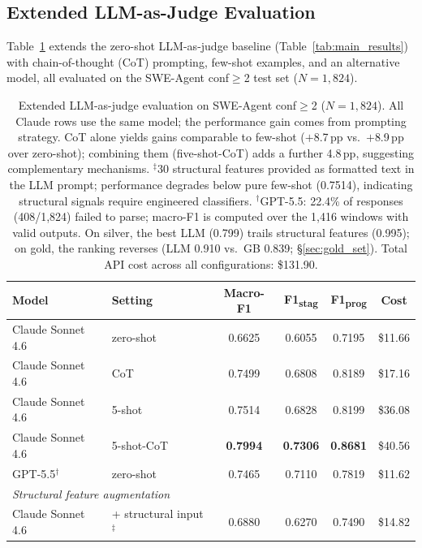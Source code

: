 \subsection{Extended LLM-as-Judge Evaluation}
\label{sec:llm_extended}

Table~\ref{tab:llm_extended} extends the zero-shot LLM-as-judge baseline (Table~\ref{tab:main_results}) with chain-of-thought (CoT) prompting, few-shot examples, and an alternative model, all evaluated on the SWE-Agent conf${\geq}$2 test set ($N{=}1{,}824$).

\begin{table}[h]
\centering
\small
\begin{tabular}{llcccc}
\toprule
\textbf{Model} & \textbf{Setting} & \textbf{Macro-F1} & \textbf{F1\textsubscript{stag}} & \textbf{F1\textsubscript{prog}} & \textbf{Cost} \\
\midrule
Claude Sonnet 4.6 & zero-shot & 0.6625 & 0.6055 & 0.7195 & \$11.66 \\
Claude Sonnet 4.6 & CoT & 0.7499 & 0.6808 & 0.8189 & \$17.16 \\
Claude Sonnet 4.6 & 5-shot & 0.7514 & 0.6828 & 0.8199 & \$36.08 \\
Claude Sonnet 4.6 & 5-shot-CoT & \textbf{0.7994} & \textbf{0.7306} & \textbf{0.8681} & \$40.56 \\
GPT-5.5$^\dagger$ & zero-shot & 0.7465 & 0.7110 & 0.7819 & \$11.62 \\
\midrule
\multicolumn{6}{l}{\emph{Structural feature augmentation}} \\
Claude Sonnet 4.6 & + structural input$^\ddagger$ & 0.6880 & 0.6270 & 0.7490 & \$14.82 \\
\bottomrule
\end{tabular}
\caption{Extended LLM-as-judge evaluation on SWE-Agent conf${\geq}$2 ($N{=}1{,}824$). All Claude rows use the same model; the performance gain comes from prompting strategy. CoT alone yields gains comparable to few-shot ($+$8.7\,pp vs.\ $+$8.9\,pp over zero-shot); combining them (five-shot-CoT) adds a further 4.8\,pp, suggesting complementary mechanisms. $^\ddagger$30 structural features provided as formatted text in the LLM prompt; performance degrades below pure few-shot (0.7514), indicating structural signals require engineered classifiers. $^\dagger$GPT-5.5: 22.4\% of responses (408/1,824) failed to parse; macro-F1 is computed over the 1,416 windows with valid outputs. On silver, the best LLM (0.799) trails structural features (0.995); on gold, the ranking reverses (LLM 0.910 vs.\ GB 0.839; \S\ref{sec:gold_set}). Total API cost across all configurations: \$131.90.}
\label{tab:llm_extended}
\end{table}

